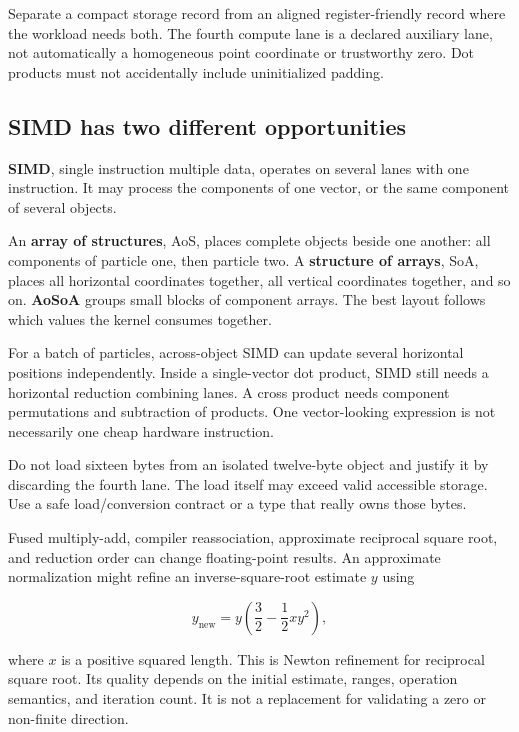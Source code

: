 Separate a compact storage record from an aligned register-friendly record where the workload needs both. The fourth compute lane is a declared auxiliary lane, not automatically a homogeneous point coordinate or trustworthy zero. Dot products must not accidentally include uninitialized padding.

\subsection{SIMD has two different opportunities}\label{02-foundations-ii-ch037-simd-has-two-different-opportunities}

\textbf{SIMD}, single instruction multiple data, operates on several lanes with one instruction. It may process the components of one vector, or the same component of several objects.

An \textbf{array of structures}, AoS, places complete objects beside one another: all components of particle one, then particle two. A \textbf{structure of arrays}, SoA, places all horizontal coordinates together, all vertical coordinates together, and so on. \textbf{AoSoA} groups small blocks of component arrays. The best layout follows which values the kernel consumes together.

For a batch of particles, across-object SIMD can update several horizontal positions independently. Inside a single-vector dot product, SIMD still needs a horizontal reduction combining lanes. A cross product needs component permutations and subtraction of products. One vector-looking expression is not necessarily one cheap hardware instruction.

Do not load sixteen bytes from an isolated twelve-byte object and justify it by discarding the fourth lane. The load itself may exceed valid accessible storage. Use a safe load/conversion contract or a type that really owns those bytes.

Fused multiply-add, compiler reassociation, approximate reciprocal square root, and reduction order can change floating-point results. An approximate normalization might refine an inverse-square-root estimate \(y\) using

\[
y_{\mathrm{new}}=y\left(\frac32-\frac12xy^2\right),
\]

where \(x\) is a positive squared length. This is Newton refinement for reciprocal square root. Its quality depends on the initial estimate, ranges, operation semantics, and iteration count. It is not a replacement for validating a zero or non-finite direction.


